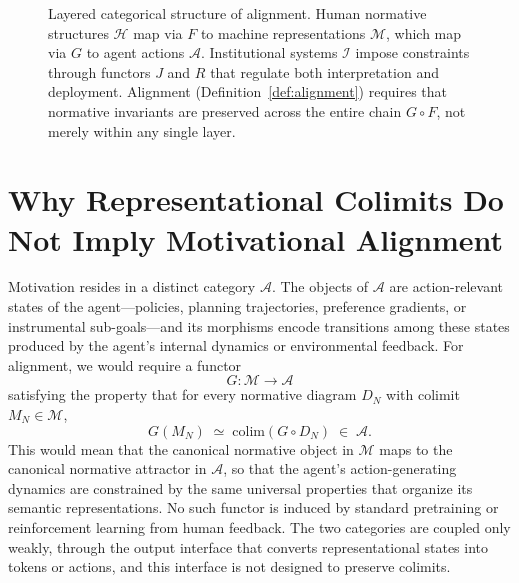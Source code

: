 \documentclass[12pt]{article}
\theoremstyle{definition}
\begin{document}
\begin{figure}[h]
\centering
{}
\caption{Layered categorical structure of alignment. Human normative
structures $\mathcal{H}$ map via $F$ to machine representations
$\mathcal{M}$, which map via $G$ to agent actions $\mathcal{A}$.
Institutional systems $\mathcal{I}$ impose constraints through functors $J$
and $R$ that regulate both interpretation and deployment. Alignment
(Definition~\ref{def:alignment}) requires that normative invariants are
preserved across the entire chain $G \circ F$, not merely within any
single layer.}
\label{fig:stack}
\end{figure}

\section{Why Representational Colimits Do Not Imply Motivational Alignment}

Motivation resides in a distinct category $\mathcal{A}$. The objects of
$\mathcal{A}$ are action-relevant states of the agent---policies, planning
trajectories, preference gradients, or instrumental sub-goals---and its
morphisms encode transitions among these states produced by the agent's internal
dynamics or environmental feedback. For alignment, we would require a functor
\begin{equation}
  G : \mathcal{M} \to \mathcal{A}
\end{equation}
satisfying the property that for every normative diagram $D_N$ with colimit
$M_N \in \mathcal{M}$,
\begin{equation}
  G(M_N) \;\simeq\; \mathrm{colim}(G \circ D_N) \;\in\; \mathcal{A}.
\end{equation}
This would mean that the canonical normative object in $\mathcal{M}$ maps to
the canonical normative attractor in $\mathcal{A}$, so that the agent's
action-generating dynamics are constrained by the same universal properties
that organize its semantic representations. No such functor is induced by
standard pretraining or reinforcement learning from human feedback. The two
categories are coupled only weakly, through the output interface that converts
representational states into tokens or actions, and this interface is not
designed to preserve colimits.
\end{document}
